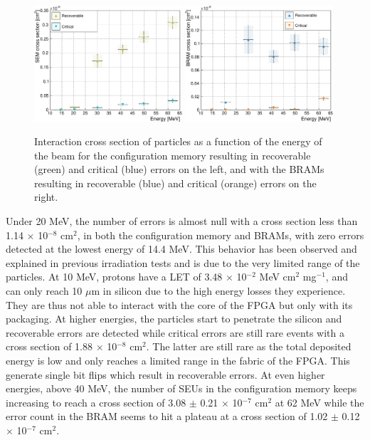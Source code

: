       \begin{figure}[h!]
        \centering
        \includegraphics[width=0.49\textwidth]{img/plots/cE_SEM-crop}
        \includegraphics[width=0.49\textwidth]{img/plots/cE_BRAM-crop}
        \caption{Interaction cross section of particles as a function of the energy of the beam for the configuration memory resulting in recoverable (green) and critical (blue) errors on the left, and with the BRAMs resulting in recoverable (blue) and critical (orange) errors on the right.}
        \label{fig:II-5-data-seu-energy}
      \end{figure}

      Under 20 MeV, the number of errors is almost null with a cross section less than 1.14 $\times$ 10$^{-8}$ cm$^2$, in both the configuration memory and BRAMs, with zero errors detected at the lowest energy of 14.4 MeV. This behavior has been observed and explained in previous irradiation tests \cite{Bylsma2013242, Huhtinen2000155} and is due to the very limited range of the particles. At 10 MeV, protons have a LET of 3.48 $\times$ 10$^{-2}$ MeV cm$^2$ mg$^{-1}$, and can only reach 10 $\mu$m in silicon due to the high energy losses they experience. They are thus not able to interact with the core of the FPGA but only with its packaging. At higher energies, the particles start to penetrate the silicon and recoverable errors are detected while critical errors are still rare events with a cross section of 1.88 $ \times $ 10$^{-8}$ cm$^2$. The latter are still rare as the total deposited energy is low and only reaches a limited range in the fabric of the FPGA. This generate single bit flips which result in recoverable errors. At even higher energies, above 40 MeV, the number of SEUs in the configuration memory keeps increasing to reach a cross section of 3.08 $\pm$ 0.21 $ \times $ 10$^{-7}$ cm$^2$ at 62 MeV while the error count in the BRAM seems to hit a plateau at a cross section of 1.02 $\pm$ 0.12 $ \times $ 10$^{-7}$ cm$^2$. \\


